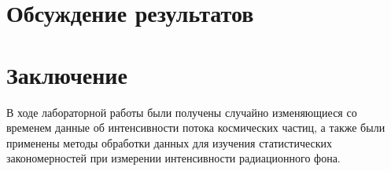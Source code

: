 \documentclass[a4paper, 12pt]{article}
\begin{document}
\section {Обсуждение результатов}


\section {Заключение}
В ходе лабораторной работы были получены случайно изменяющиеся со временем данные об интенсивности потока космических частиц, а также были применены методы обработки данных для изучения статистических закономерностей при измерении интенсивности радиационного фона.
\end{document}
